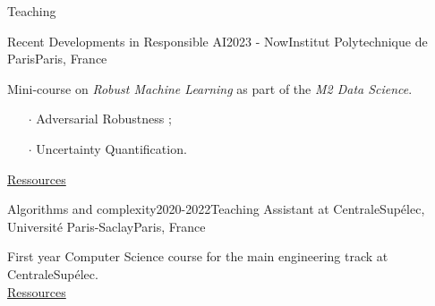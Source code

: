 \documentclass{resume} %
\begin{document}

\begin{rSection}{Teaching}

\begin{rSubsection}{Recent Developments in Responsible AI}{2023 - Now}{Institut Polytechnique de Paris}{Paris, France}
    \item[] Mini-course on \emph{Robust Machine Learning} as part of the \textit{M2 Data Science}.
    \begin{itemize}
        \item[$\cdot$] Adversarial Robustness ;
        \item[$\cdot$] Uncertainty Quantification.
    \end{itemize}
    \href{https://responsible-ai-datascience-ipparis.github.io/}{Ressources}
\end{rSubsection}

\begin{rSubsection}{Algorithms and complexity}{2020-2022}{Teaching Assistant at CentraleSupélec, Université Paris-Saclay}{Paris, France}
    \item[] First year Computer Science course for the main engineering track at CentraleSupélec. \\
    \href{https://wdi.centralesupelec.fr/1CC2000/}{Ressources}
\end{rSubsection}

\end{rSection}
\vspace{-15pt}


\end{document}
